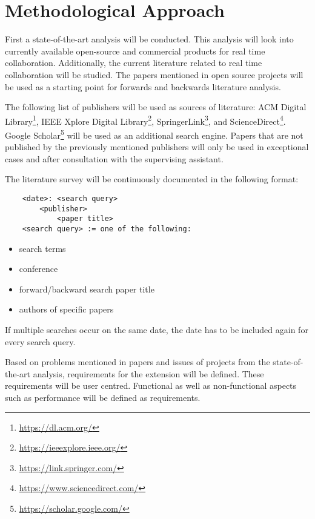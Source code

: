 \chapter{Methodological Approach}

First a state-of-the-art analysis will be conducted. This analysis will look into currently available open-source and commercial products for real time collaboration. 
Additionally, the current literature related to real time collaboration will be studied.
The papers mentioned in open source projects will be used as a starting point for forwards and backwards literature analysis.


The following list of publishers will be used as sources of literature: ACM Digital Library\footnote{\href{https://dl.acm.org/}{https://dl.acm.org/}}, IEEE Xplore Digital Library\footnote{\href{https://ieeexplore.ieee.org/}{https://ieeexplore.ieee.org/}}, SpringerLink\footnote{\href{https://link.springer.com/}{https://link.springer.com/}}, and ScienceDirect\footnote{\href{https://www.sciencedirect.com/}{https://www.sciencedirect.com/}}. Google Scholar\footnote{\href{https://scholar.google.com/}{https://scholar.google.com/}} will be used as an additional search engine. Papers that are not published by the previously mentioned publishers will only be used in exceptional cases and after consultation with the supervising assistant.


The literature survey will be continuously documented in the following format:

\begin{lstlisting}
	<date>: <search query>
		<publisher>
			<paper title>
	<search query> := one of the following:
\end{lstlisting}

\begin{itemize}
    \item search terms
    \item conference
    \item forward/backward search paper title
    \item authors of specific papers 
\end{itemize}
If multiple searches occur on the same date, the date has to be included again for every search query.

Based on problems mentioned in papers and issues of projects from the state-of-the-art analysis, requirements for the extension will be defined.
These requirements will be user centred.
Functional as well as non-functional aspects such as performance will be defined as requirements.

